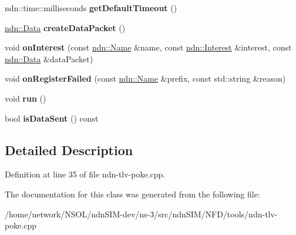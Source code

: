 \begin{DoxyCompactItemize}
\item 
ndn\+::time\+::milliseconds {\bfseries get\+Default\+Timeout} ()\hypertarget{classndntlvpoke_1_1NdnTlvPoke_a343816b9ec0e65344f1653424bd08d78}{}\label{classndntlvpoke_1_1NdnTlvPoke_a343816b9ec0e65344f1653424bd08d78}

\item 
\hyperlink{classndn_1_1Data}{ndn\+::\+Data} {\bfseries create\+Data\+Packet} ()\hypertarget{classndntlvpoke_1_1NdnTlvPoke_a4eb650cf20a74e1208ab08ae1b1bc511}{}\label{classndntlvpoke_1_1NdnTlvPoke_a4eb650cf20a74e1208ab08ae1b1bc511}

\item 
void {\bfseries on\+Interest} (const \hyperlink{classndn_1_1Name}{ndn\+::\+Name} \&name, const \hyperlink{classndn_1_1Interest}{ndn\+::\+Interest} \&interest, const \hyperlink{classndn_1_1Data}{ndn\+::\+Data} \&data\+Packet)\hypertarget{classndntlvpoke_1_1NdnTlvPoke_a8d791ffed5389abc497821b5ba9c23b4}{}\label{classndntlvpoke_1_1NdnTlvPoke_a8d791ffed5389abc497821b5ba9c23b4}

\item 
void {\bfseries on\+Register\+Failed} (const \hyperlink{classndn_1_1Name}{ndn\+::\+Name} \&prefix, const std\+::string \&reason)\hypertarget{classndntlvpoke_1_1NdnTlvPoke_a7d192197647ad2d75f0edff199ee59b8}{}\label{classndntlvpoke_1_1NdnTlvPoke_a7d192197647ad2d75f0edff199ee59b8}

\item 
void {\bfseries run} ()\hypertarget{classndntlvpoke_1_1NdnTlvPoke_ac26b7585687df329a3c0629c9c2d8bce}{}\label{classndntlvpoke_1_1NdnTlvPoke_ac26b7585687df329a3c0629c9c2d8bce}

\item 
bool {\bfseries is\+Data\+Sent} () const\hypertarget{classndntlvpoke_1_1NdnTlvPoke_aed02ffa109eef5cdc062a7b68c00b0a7}{}\label{classndntlvpoke_1_1NdnTlvPoke_aed02ffa109eef5cdc062a7b68c00b0a7}

\end{DoxyCompactItemize}


\subsection{Detailed Description}


Definition at line 35 of file ndn-\/tlv-\/poke.\+cpp.



The documentation for this class was generated from the following file\+:\begin{DoxyCompactItemize}
\item 
/home/network/\+N\+S\+O\+L/ndn\+S\+I\+M-\/dev/ns-\/3/src/ndn\+S\+I\+M/\+N\+F\+D/tools/ndn-\/tlv-\/poke.\+cpp\end{DoxyCompactItemize}
